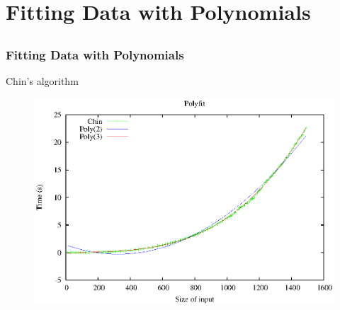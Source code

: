 \documentclass[10pt]{beamer}
\begin{document}
\section{Fitting Data with Polynomials}
\subsection[Chin's algorithm]{}
\begin{frame}
  \frametitle{Fitting Data with Polynomials}
Chin's algorithm
\begin{center}
\begin{figure}[ht]
	\centering
	\includegraphics[scale=0.7]{images/polyfit-chin.eps}
\end{figure}
\end{center}
\end{frame}
\end{document}
